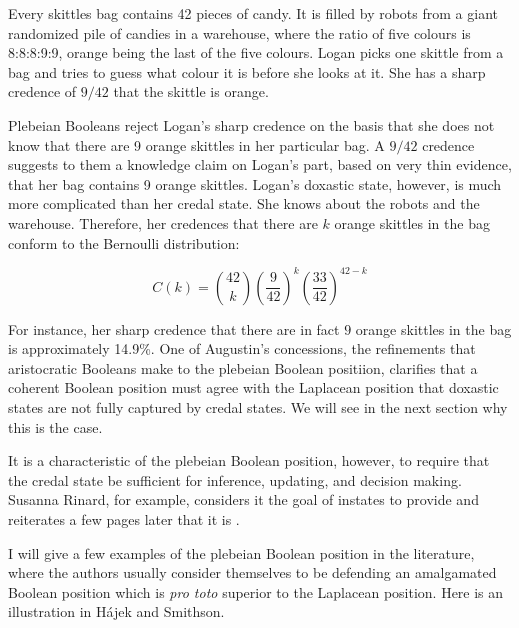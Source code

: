 \documentclass[12pt]{article}
\begin{document}
\begin{quotex}
  \label{ex:skittles} Every skittles bag contains
  42 pieces of candy. It is filled by robots from a giant randomized
  pile of candies in a warehouse, where the ratio of five colours is
  8:8:8:9:9, orange being the last of the five colours. Logan picks
  one skittle from a bag and tries to guess what colour it is before
  she looks at it. She has a sharp credence of $9/42$ that the skittle
  is orange.
\end{quotex}

Plebeian Booleans reject Logan's sharp credence on the basis that she
does not know that there are 9 orange skittles in her particular bag.
A $9/42$ credence suggests to them a knowledge claim on Logan's part,
based on very thin evidence, that her bag contains 9 orange skittles.
Logan's doxastic state, however, is much more complicated than her
credal state. She knows about the robots and the warehouse. Therefore,
her credences that there are $k$ orange skittles in the bag conform to
the Bernoulli distribution:

\begin{equation}
  \label{eq:bern}
  C(k)=\binom{42}{k}\left(\frac{9}{42}\right)^{k}\left(\frac{33}{42}\right)^{42-k}
\end{equation}

For instance, her sharp credence that there are in fact $9$ orange
skittles in the bag is approximately 14.9\%. One of Augustin's
concessions, the refinements that aristocratic Booleans make to the
plebeian Boolean positiion, clarifies that a coherent Boolean position
must agree with the Laplacean position that doxastic states are not
fully captured by credal states. We will see in the next section why
this is the case.

It is a characteristic of the plebeian Boolean position, however, to
require that the credal state be sufficient for inference, updating,
and decision making. Susanna Rinard, for example, considers it the
goal of instates to provide   and reiterates a few
pages later that it is  .

I will give a few examples of the plebeian Boolean position in the
literature, where the authors usually consider themselves to be
defending an amalgamated Boolean position which is \emph{pro toto}
superior to the Laplacean position. Here is an illustration in
H{\'a}jek and Smithson.
\end{document}
